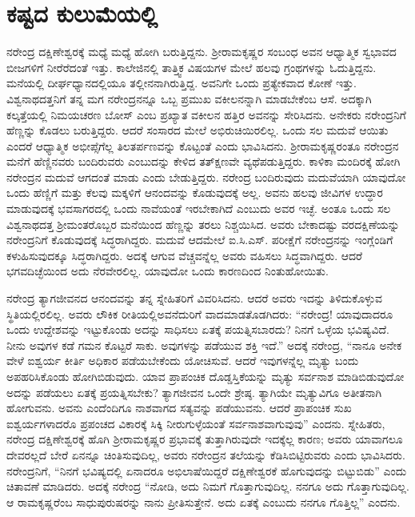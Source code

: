 
\chapter{ಕಷ್ಟದ ಕುಲುಮೆಯಲ್ಲಿ}

ನರೇಂದ್ರ ದಕ್ಷಿಣೇಶ್ವರಕ್ಕೆ ಮಧ್ಯೆ ಮಧ್ಯೆ ಹೋಗಿ ಬರುತ್ತಿದ್ದನು. ಶ‍್ರೀರಾಮಕೃಷ್ಣರ ಸಂಬಂಧ ಅವನ ಆಧ್ಯಾತ್ಮಿಕ ಸ್ವಭಾವದ ಬೀಜಗಳಿಗೆ ನೀರೆರೆದಂತೆ ಇತ್ತು. ಕಾಲೇಜಿನಲ್ಲಿ ತಾತ್ತ್ವಿಕ ವಿಷಯಗಳ ಮೇಲೆ ಹಲವು ಗ್ರಂಥಗಳನ್ನು ಓದುತ್ತಿದ್ದನು. ಮನೆಯಲ್ಲಿ ದೀರ್ಘಧ್ಯಾನದಲ್ಲಿಯೂ ತಲ್ಲೀನನಾಗಿರುತ್ತಿದ್ದ. ಅವನಿಗೇ ಒಂದು ಪ್ರತ್ಯೇಕವಾದ ಕೋಣೆ ಇತ್ತು. ವಿಶ್ವನಾಥದತ್ತನಿಗೆ ತನ್ನ ಮಗ ನರೇಂದ್ರನನ್ನೂ ಒಬ್ಬ ಪ್ರಮುಖ ವಕೀಲನನ್ನಾಗಿ ಮಾಡಬೇಕೆಂಬ ಆಸೆ. ಅದಕ್ಕಾಗಿ ಕಲ್ಕತ್ತೆಯಲ್ಲಿ ನಿಮಯಚರಣ ಬೋಸ್ ಎಂಬ ಪ್ರಖ್ಯಾತ ವಕೀಲನ ಹತ್ತಿರ ಅವನನ್ನು ಸೇರಿಸಿದನು. ಅನೇಕರು ನರೇಂದ್ರನಿಗೆ ಹೆಣ್ಣನ್ನು ಕೊಡಲು ಬರುತ್ತಿದ್ದರು. ಆದರೆ ಸಂಸಾರದ ಮೇಲೆ ಅಭಿರುಚಿಯಿರಲಿಲ್ಲ. ಒಂದು ಸಲ ಮದುವೆ ಆಯಿತು ಎಂದರೆ ಆಧ್ಯಾತ್ಮಿಕ ಅಭೀಪ್ಸೆಗೆಲ್ಲ ತಿಲತರ್ಪಣವನ್ನು ಕೊಟ್ಟಂತೆ ಎಂದು ಭಾವಿಸಿದನು. ಶ‍್ರೀರಾಮಕೃಷ್ಣರಂತೂ ನರೇಂದ್ರನ ಮನೆಗೆ ಹೆಣ್ಣಿನವರು ಬಂದಿರುವರು ಎಂಬುದನ್ನು ಕೇಳಿದ ತತ್‍ಕ್ಷಣವೇ ವ್ಯಥೆಪಡುತ್ತಿದ್ದರು. ಕಾಳಿಕಾ ಮಂದಿರಕ್ಕೆ ಹೋಗಿ ನರೇಂದ್ರನ ಮದುವೆ ಆಗದಂತೆ ಮಾಡು ಎಂದು ಬೇಡುತ್ತಿದ್ದರು. ನರೇಂದ್ರ ಬಂದಿರುವುದು ಮದುವೆಯಾಗಿ ಯಾವುದೋ ಒಂದು ಹೆಣ್ಣಿಗೆ ಮತ್ತು ಕೆಲವು ಮಕ್ಕಳಿಗೆ ಆನಂದವನ್ನು ಕೊಡುವುದಕ್ಕೆ ಅಲ್ಲ. ಅವನು ಹಲವು ಜೀವಿಗಳ ಉದ್ಧಾರ ಮಾಡುವುದಕ್ಕೆ ಭವಸಾಗರದಲ್ಲಿ ಒಂದು ನಾವೆಯಂತೆ ಇರಬೇಕಾಗಿದೆ ಎಂಬುದು ಅವರ ಇಚ್ಛೆ. ಅಂತೂ ಒಂದು ಸಲ ವಿಶ್ವನಾಥದತ್ತ ಶ‍್ರೀಮಂತರೊಬ್ಬರ ಮನೆಯಿಂದ ಹೆಣ್ಣನ್ನು ತರಲು ನಿಶ್ಚಯಿಸಿದ. ಅವರು ಬೇಕಾದಷ್ಟು ವರದಕ್ಷಿಣೆಯನ್ನು ನರೇಂದ್ರನಿಗೆ ಕೊಡುವುದಕ್ಕೆ ಸಿದ್ಧರಾಗಿದ್ದರು. ಮದುವೆ ಆದಮೇಲೆ ಐ.ಸಿ.ಎಸ್. ಪರೀಕ್ಷೆಗೆ ನರೇಂದ್ರನನ್ನು ಇಂಗ್ಲೆಂಡಿಗೆ ಕಳುಹಿಸುವುದಕ್ಕೂ ಸಿದ್ಧರಾಗಿದ್ದರು. ಅದಕ್ಕೆ ಆಗುವ ವೆಚ್ಚವನ್ನೆಲ್ಲ ಅವರು ವಹಿಸಲು ಸಿದ್ಧವಾಗಿದ್ದರು. ಆದರೆ ಭಗವದಿಚ್ಛೆಯಿಂದ ಅದು ನೆರವೇರಲಿಲ್ಲ. ಯಾವುದೋ ಒಂದು ಕಾರಣದಿಂದ ನಿಂತುಹೋಯಿತು.

ನರೇಂದ್ರ ತ್ಯಾಗಜೀವನದ ಆನಂದವನ್ನು ತನ್ನ ಸ್ನೇಹಿತರಿಗೆ ವಿವರಿಸಿದನು. ಆದರೆ ಅವರು ಇದನ್ನು ತಿಳಿದುಕೊಳ್ಳುವ ಸ್ಥಿತಿಯಲ್ಲಿರಲಿಲ್ಲ. ಅವರು ಲೌಕಿಕ ರೀತಿಯಲ್ಲಿ\break ಅವನೆದುರಿಗೆ ವಾದಮಾಡತೊಡಗಿದರು: “ನರೇಂದ್ರ! ಯಾವುದಾದರೂ ಒಂದು ಉದ್ದೇಶವನ್ನು ಇಟ್ಟುಕೊಂಡು ಅದನ್ನು ಸಾಧಿಸಲು ಏತಕ್ಕೆ ಪಯತ್ನಿಸಬಾರದು? ನಿನಗೆ ಒಳ್ಳೆಯ ಭವಿಷ್ಯವಿದೆ. ನೀನು ಅವುಗಳ ಕಡೆ ಗಮನ ಕೊಟ್ಟರೆ ಸಾಕು. ಅವುಗಳನ್ನು ಪಡೆಯುವ ಶಕ್ತಿ ಇದೆ.” ಅದಕ್ಕೆ ನರೇಂದ್ರ, “ನಾನೂ ಅನೇಕ ವೇಳೆ ಐಶ್ವರ್ಯ ಕೀರ್ತಿ ಅಧಿಕಾರ ಪಡೆಯಬೇಕೆಂದು ಯೋಚಿಸುವೆ. ಆದರೆ ಇವುಗಳನ್ನೆಲ್ಲ ಮೃತ್ಯು ಬಂದು ಅಪಹರಿಸಿಕೊಂಡು ಹೋಗಿಬಿಡುವುದು. ಯಾವ ಪ್ರಾಪಂಚಿಕ ದೊಡ್ಡಸ್ತಿಕೆಯನ್ನು ಮೃತ್ಯು ಸರ್ವನಾಶ ಮಾಡಿಬಿಡುವುದೋ ಅದನ್ನು ಪಡೆಯಲು ಏತಕ್ಕೆ ಪ್ರಯತ್ನಿಸಬೇಕು? ತ್ಯಾಗಜೀವನ ಒಂದೇ ಶ್ರೇಷ್ಠ. ತ್ಯಾಗಿಯೇ ಮೃತ್ಯುವಿಗೂ ಅತೀತನಾಗಿ ಹೋಗುವನು. ಅವನು ಎಂದೆಂದಿಗೂ ನಾಶವಾಗದ ಸತ್ಯವನ್ನು ಪಡೆಯುವನು. ಆದರೆ ಪ್ರಾಪಂಚಿಕ ಸುಖ ಐಶ್ವರ್ಯಗಳಾದರೊ ಪ್ರಪಂಚದ ವಿಕಾರಕ್ಕೆ ಸಿಕ್ಕಿ ನೀರುಗುಳ್ಳೆಯಂತೆ ಸರ್ವನಾಶವಾಗುವುವು” ಎಂದನು. ಸ್ನೇಹಿತರು, ನರೇಂದ್ರ ದಕ್ಷಿಣೇಶ್ವರಕ್ಕೆ ಹೊಗಿ ಶ‍್ರೀರಾಮಕೃಷ್ಣರ ಪ್ರಭಾವಕ್ಕೆ ತುತ್ತಾಗಿರುವುದೇ ಇದಕ್ಕೆಲ್ಲ ಕಾರಣ; ಅವರು ಯಾವಾಗಲೂ ದೇವರಲ್ಲದೆ ಬೇರೆ ಏನನ್ನೂ ಚಿಂತಿಸುವುದಿಲ್ಲ, ಅವರು ನರೇಂದ್ರನ ತಲೆಯನ್ನು ಕೆಡಿಸಿಬಿಟ್ಟಿರುವರು ಎಂದು ಭಾವಿಸಿದರು. ನರೇಂದ್ರನಿಗೆ, “ನಿನಗೆ ಭವಿಷ್ಯದಲ್ಲಿ ಏನಾದರೂ ಅಭಿಲಾಷೆಯಿದ್ದರೆ ದಕ್ಷಿಣೇಶ್ವರಕೆ ಹೊಗುವುದನ್ನು ಬಿಟ್ಟುಬಿಡು” ಎಂದು ಚಿತಾವಣೆ ಮಾಡಿದರು. ಅದಕ್ಕೆ ನರೇಂದ್ರ “ನೋಡಿ, ಅದು ನಿಮಗೆ ಗೊತ್ತಾಗುವುದಿಲ್ಲ. ನನಗೂ ಅದು ಗೊತ್ತಾಗುವುದಿಲ್ಲ. ಆ ರಾಮಕೃಷ್ಣರೆಂಬ ಸಾಧುಪುರುಷರನ್ನು ನಾನು ಪ್ರೀತಿಸುತ್ತೇನೆ. ಅದು ಏತಕ್ಕೆ ಎಂಬುದು ನನಗೂ ಗೊತ್ತಿಲ್ಲ” ಎಂದನು.

